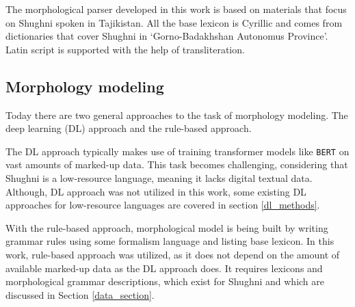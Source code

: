 The morphological parser developed in this work is based on materials that focus on Shughni spoken in Tajikistan. All the base lexicon is Cyrillic and comes from dictionaries that cover Shughni in `Gorno-Badakhshan Autonomus Province'. Latin script is supported with the help of transliteration.

\subsection{Morphology modeling}
Today there are two general approaches to the task of morphology modeling. The deep learning (DL) approach and the rule-based approach. 

The DL approach typically makes use of training transformer models like \texttt{BERT} \parencite{devlin_2019} on vast amounts of marked-up data. This task becomes challenging, considering that Shughni is a low-resource language, meaning it lacks digital textual data. Although, DL approach was not utilized in this work, some existing DL approaches for low-resource languages are covered in section \ref{dl_methods}.

With the rule-based approach, morphological model is being built by writing grammar rules using some formalism language and listing base lexicon. In this work, rule-based approach was utilized, as it does not depend on the amount of available marked-up data as the DL approach does. It requires lexicons and morphological grammar descriptions, which exist for Shughni and which are discussed in Section \ref{data_section}.
